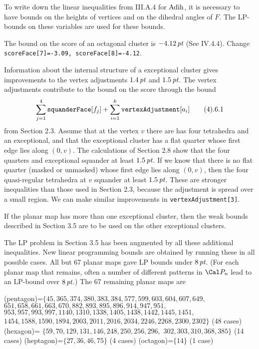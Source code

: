 To write down the linear inequalities from III.A.4 for $\operatorname{Adih}$,
it is necessary to have bounds on the heights of vertices and on
the dihedral angles of $F$.  The LP-bounds on these variables
are used for these bounds.

The bound on the score of an octagonal cluster is $-4.12\,\hbox{\it pt}$
(See IV.4.4).  Change {\tt scoreFace[7]=-3.09, scoreFace[8]=-4.12}.

Information about the internal structure of a exceptional cluster
gives improvements to 
the vertex adjustments $1.4\,\hbox{\it pt}$ and $1.5\,\hbox{\it pt}$.
The vertex adjustments contribute to the bound on the score
through the bound
$$\sum_{j=1}^4 \hbox{\tt squanderFace}[f_j]+\sum_{i=1}^k
	\hbox{\tt vertexAdjustment}[a_i]\tag 4.6.1$$
from Section 2.3.  Assume that 
at the vertex $v$ there are has four tetrahedra
and an exceptional, and that the exceptional cluster has a
flat quarter whose first edge lies along $(0,v)$. 
The 
calculations of Section 2.8 show that
the four quarters and exceptional squander at least $1.5\,\hbox{\it pt}$.
If we know that there is no flat quarter (masked or unmasked)
whose first edge lies along $(0,v)$, then the four quasi-regular
tetrahedra at $v$ squander at least $1.5\,\hbox{\it pt}$.
These are stronger inequalities than those used in Section 2.3,
because the adjustment is spread over a small region.
We can make similar improvements in {\tt vertexAdjustment[3]}.


If the planar map has more than one exceptional cluster, then the
weak bounds described in Section 3.5 are to be used on the other
exceptional clusters.

The LP problem in Section 3.5 has been augmented by all these
additional inequalities.  New linear programming bounds are obtained
by running these in all possible cases.  All but 67 
planar maps gave LP bounds
under $8\,\hbox{\it pt}$.  (For each planar map that remains, often a number
of different patterns in $\Cal P_n$ lead to an LP-bound over $8\,\hbox{\it pt}$.)
The 67 remaining planar maps are



{\obeylines
\parskip=0pt
\parindent=0pt
\hbox{}

(pentagon)=$\{45, 365, 374, 380, 383, 384, 577, 599, 603, 604, 607, 649,$ 
\quad\quad $651, 658, 661, 663, 670, 882, 893, 895, 896, 914, 947, 951,$
\quad\quad $953, 957, 993, 997, 1140, 1310, 1338, 1405, 1438, 1442, 1445, 1451,$
\quad\quad $1454, 1588, 1590, 1894, 2003, 2011, 2016, 2034, 2246, 2268,%
2300, 2302\}$ (48 cases)
(hexagon)= $\{59,70,129,131,146,248,250,256,296,$
\hfill\quad\quad$302,303,310,368,385\}$ (14 cases)
(heptagon)=$\{27,36,46,75\}$ (4 cases)
(octagon)=$\{14\}$ (1 case)

}

